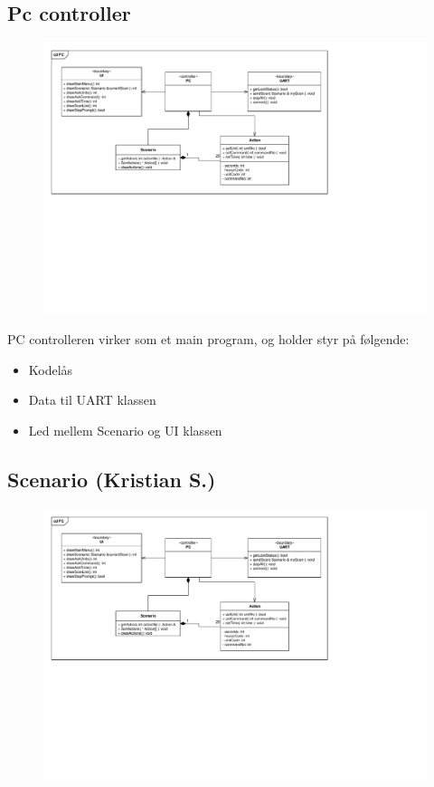 \clearpage

\subsection{Pc controller}

\begin{figure}[h]
\centering
\includegraphics[scale=1,clip=true, trim=267 444 473 60]{Systemarkitektur/diagrammer/PC_KlasseDiagram} %
\end{figure}

PC controlleren virker som et main program, og holder styr på følgende:

\begin{itemize}
\item Kodelås
\item Data til UART klassen
\item Led mellem Scenario og UI klassen
\end{itemize}


\subsection{Scenario (Kristian S.)}

\begin{figure}[h]
\centering
\includegraphics[scale=1,clip=true, trim=149 320 541 224]{../Projektdokumentation/Systemarkitektur/diagrammer/PC_KlasseDiagram.pdf} %
\end{figure}

